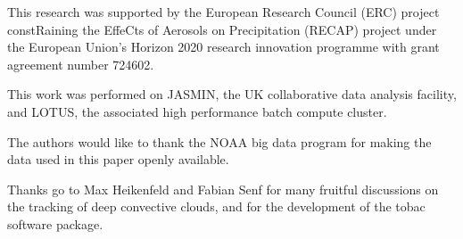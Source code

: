 \documentclass[amt, manuscript]{copernicus}
\begin{document}


\appendixfigures  %

\appendixtables   %







\begin{acknowledgements}
This research was supported by the European Research Council (ERC) project constRaining the EffeCts of Aerosols on Precipitation (RECAP) project under the European Union's Horizon 2020 research innovation programme with grant agreement number 724602.

This work was performed on JASMIN, the UK collaborative data analysis facility, and LOTUS, the associated high performance batch compute cluster.

The authors would like to thank the NOAA big data program for making the data used in this paper openly available.

Thanks go to Max Heikenfeld and Fabian Senf for many fruitful discussions on the tracking of deep convective clouds, and for the development of the tobac software package.
\end{acknowledgements}



\end{document}

